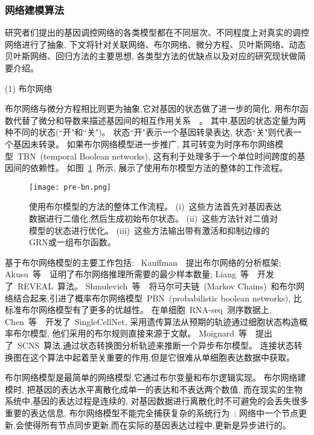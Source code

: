 \subsubsection{网络建模算法}
研究者们提出的基因调控网络的各类模型都在不同层次、不同程度上对真实的调控网络进行了抽象,
下文将针对关联网络、布尔网络、微分方程、贝叶斯网络、动态贝叶斯网络、回归方法的主要思想,
各类型方法的优缺点以及对应的研究现状做简要介绍。

(1) 布尔网络

布尔网络与微分方程相比则更为抽象,它对基因的状态做了进一步的简化,
用布尔函数代替了微分和导数来描述基因间的相互作用关系~\cite{shmulevich2002probabilistic,kim2007boolean,bornholdt2008boolean,zhou2016relative}~。
其中,基因的状态定量为两种不同的状态(``开"和``关")。
状态``开"表示一个基因转录表达, 状态``关"则代表一个基因未转录。
如果布尔网络模型进一步推广, 其可转变为时序布尔网络模型~TBN~(temporal Boolean networks), 这有利于处理多于一个单位时间跨度的基因间的依赖性。
如图~\ref{fig:pre-bn}~所示, 展示了使用布尔模型方法的整体的工作流程。
\begin{figure}[!htbp]
    \centering
    \texttt{[image: pre-bn.png]}
    \caption{
        使用布尔模型的方法的整体工作流程。
        (i)~这些方法首先对基因表达数据进行二值化,然后生成初始布尔状态。
        (ii)~这些方法针对二值对模型的状态进行优化。
        (iii)~这些方法输出带有激活和抑制边缘的GRN或一组布尔函数。
    }
    \label{fig:pre-bn}
\end{figure}

基于布尔网络模型的主要工作包括:
~Kauffman~\cite{kauffman2003random}~提出布尔网络的分析框架;
Akusu~等~\cite{akutsu1999identification}~证明了布尔网络推理所需要的最少样本数量;
Liang~等~\cite{liang1998reveal}~开发了~REVEAL~算法。
Shmulevich~等~\cite{marshall2007inference}~将马尔可夫链~(Markov Chains)~和布尔网络结合起来,引进了概率布尔网络模型~PBN~(probabilistic boolean networks),
比标准布尔网络模型有了更多的优越性。
在单细胞~RNA-seq~测序数据上,
Chen~等~\cite{chen2014single}~开发了~SingleCellNet,
采用遗传算法从预期的轨迹通过细胞状态构造概率布尔模型, 他们采用的布尔规则直接来源于文献。
Moignard~等~\cite{moignard2015decoding}~提出了~SCNS~算法,通过状态转换图分析轨迹来推断一个异步布尔模型。
连接状态转换图在这个算法中起着至关重要的作用,但是它很难从单细胞表达数据中获取。

布尔网络模型是最简单的网络模型,它通过布尔变量和布尔逻辑实现。
布尔网络建模时, 把基因的表达水平离散化成单一的表达和不表达两个数值,
而在现实的生物系统中,基因的表达过程是连续的,
对基因数据进行离散化时不可避免的会丢失很多重要的表达信息,
布尔网络模型不能完全捕获复杂的系统行为~\cite{lee2009computational};
网络中一个节点更新,会使得所有节点同步更新,而在实际的基因表达过程中,更新是异步进行的。

